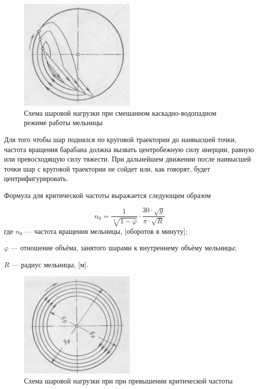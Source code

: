 \documentclass[utf8x, 14pt, oneside, a4paper]{article}
\begin{document}
\begin{figure}[H]
	\centering
	\includegraphics[width=0.5\textwidth]{smeshan_theory} 
	\caption{Схема шаровой нагрузки при смешанном каскадно-водопадном режиме работы мельницы}
	\label{pic:smeshan_theory}
\end{figure} 

Для того чтобы шар поднялся по круговой траектории до наивысшей точки, частота вращения барабана должна вызвать центробежную силу инерции, равную или превосходящую силу тяжести.
При дальнейшем движении после наивысшей точки шар с круговой траектории не сойдет или, как говорят, будет центрифигурировать.

Формула для критической частоты выражается следующим образом

\begin{equation}
\label{freq_kritic}
n_0 = \dfrac{1}{\sqrt[4]{1 - \varphi}} \cdot \dfrac{30 \cdot \sqrt{g}}{\pi \cdot \sqrt{R}}
\end{equation}
где $n_0$ --- частота вращения мельницы, [оборотов в минуту];

$\varphi$ --- отношение объёма, занятого шарами к внутреннему объёму мельницы;

$R$ --- радиус мельницы, [м].

\begin{figure}[H]
	\centering
	\includegraphics[width=0.5\textwidth]{kritic_theory} 
	\caption{Схема шаровой нагрузки при при превышении критической частоты}
	\label{pic:kritic_theory}
\end{figure} 
\end{document}

